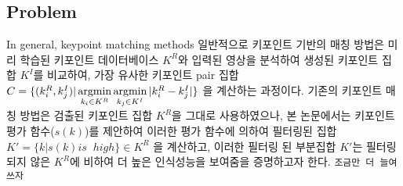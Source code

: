 
\subsection{Problem}
In general, keypoint matching methods 
일반적으로 키포인트 기반의 매칭 방법은 미리 학습된 키포인트 데이터베이스 $K^R$와 입력된 영상을 분석하여 생성된 키포인트 집합 $K^I$를 비교하여, 가장 유사한 키포인트 pair 집합  $C = \{(k_i^R, k_j^I) | \operatorname*{argmin}\limits_{k_i\in K^R}  \operatorname*{argmin}\limits_{k_j\in K^I} | k_i^R - k_j^I | \}$ 을 계산하는 과정이다. 기존의 키포인트 매칭 방법은 검출된 키포인트 집합 $K^R$을 그대로 사용하였으나, 본 논문에서는 키포인트 평가 함수($s(k)$)를 제안하여 이러한 평가 함수에 의하여 필터링된 집합 $K' = \{ k | s(k) is\;\; high \} \in K^R$ 을 계산하고, 이러한 필터링 된 부분집합 $K'$는 필터링 되지 않은 $K^R$에 비하여 더 높은 인식성능을 보여줌을 증명하고자 한다. \texttt{조금만 더 늘여쓰자}